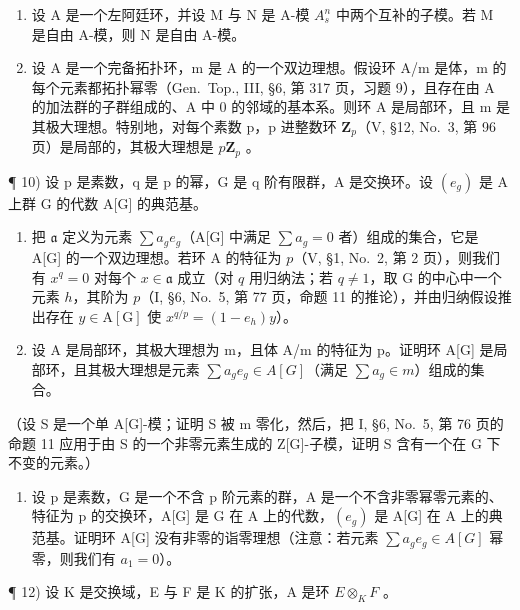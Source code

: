 \begin{enumerate}
\def\labelenumi{\arabic{enumi})}
\setcounter{enumi}{7}
\item
  设 A 是一个左阿廷环，并设 M 与 N 是 A-模 \(A_{s}^{n}\) 中两个互补的子模。若 M 是自由 A-模，则 N 是自由 A-模。
\item
  设 A 是一个完备拓扑环，m 是 A 的一个双边理想。假设环 A/m 是体，m 的每个元素都拓扑幂零（Gen.~Top., III, §6, 第 317 页，习题 9），且存在由 A 的加法群的子群组成的、A 中 0 的邻域的基本系。则环 A 是局部环，且 m 是其极大理想。特别地，对每个素数 p，p 进整数环 \(\mathbf{Z}_{p}\)（V, §12, No.~3, 第 96 页）是局部的，其极大理想是 \(p\mathbf{Z}_{p}\) 。
\end{enumerate}

¶ 10) 设 p 是素数，q 是 p 的幂，G 是 q 阶有限群，A 是交换环。设 \((e_{g})\) 是 A 上群 G 的代数 A{[}G{]} 的典范基。

\begin{enumerate}
\def\labelenumi{\alph{enumi})}
\item
  把 \(\mathfrak{a}\) 定义为元素 \(\sum a_{g}e_{g}\)（A{[}G{]} 中满足 \(\sum a_{g} = 0\) 者）组成的集合，它是 A{[}G{]} 的一个双边理想。若环 A 的特征为 \(p\)（V, §1, No.~2, 第 2 页），则我们有 \(x^{q} = 0\) 对每个 \(x\in \mathfrak{a}\) 成立（对 \(q\) 用归纳法；若 \(q\neq 1\)，取 G 的中心中一个元素 \(h\)，其阶为 \(p\)（I, §6, No.~5, 第 77 页，命题 11 的推论），并由归纳假设推出存在 \(y\in \mathrm{A}[\mathrm{G}]\) 使 \(x^{q / p} = (1 - e_h)y\)）。
\item
  设 A 是局部环，其极大理想为 m，且体 A/m 的特征为 p。证明环 A{[}G{]} 是局部环，且其极大理想是元素 \(\sum a_{g}e_{g}\in A[G]\)（满足 \(\sum a_{g}\in m\)）组成的集合。
\end{enumerate}

（设 S 是一个单 A{[}G{]}-模；证明 S 被 m 零化，然后，把 I, §6, No.~5, 第 76 页的命题 11 应用于由 S 的一个非零元素生成的 Z{[}G{]}-子模，证明 S 含有一个在 G 下不变的元素。）

\begin{enumerate}
\def\labelenumi{\arabic{enumi})}
\setcounter{enumi}{10}
\tightlist
\item
  设 p 是素数，G 是一个不含 p 阶元素的群，A 是一个不含非零幂零元素的、特征为 p 的交换环，A{[}G{]} 是 G 在 A 上的代数，\((e_{g})\) 是 A{[}G{]} 在 A 上的典范基。证明环 A{[}G{]} 没有非零的诣零理想（注意：若元素 \(\sum a_{g}e_{g} \in A[G]\) 幂零，则我们有 \(a_{1} = 0\)）。
\end{enumerate}

¶ 12) 设 K 是交换域，E 与 F 是 K 的扩张，A 是环 \(E \otimes_{K} F\) 。

